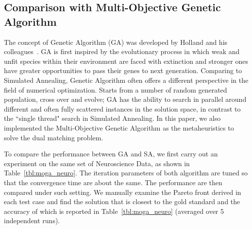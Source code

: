 \subsection{Comparison with Multi-Objective Genetic Algorithm}
The concept of Genetic Algorithm (GA) was developed by Holland and his colleagues~\cite{Holland1992}. GA is first inspired by the evolutionary process in which weak and unfit species within their environment are faced with extinction and stronger ones have greater opportunities to pass their genes to next generation. Comparing to Simulated Annealing, Genetic Algorithm often offers a different perspective in the field of numerical optimization. Starts from a number of random generated population, cross over and evolve; GA has the ability to search in parallel around different and often fully scattered instances in the solution space, in contrast to the ``single thread" search in Simulated Annealing. In this paper, we also implemented the Multi-Objective Genetic Algorithm as the metaheuristics to solve the dual matching problem.


To compare the performance between GA and SA, we first carry out an experiment on the same set of Neuroscience Data, as shown in Table~\ref{tbl:moga_neuro}. The iteration parameters of both algorithm are tuned so that the convergence time are about the same. The performance are then compared under such setting. We manually examine the Pareto front derived in each test case and find the solution that is closest to the gold standard and the accuracy of which is reported in Table~\ref{tbl:moga_neuro} (averaged over 5 independent runs).


